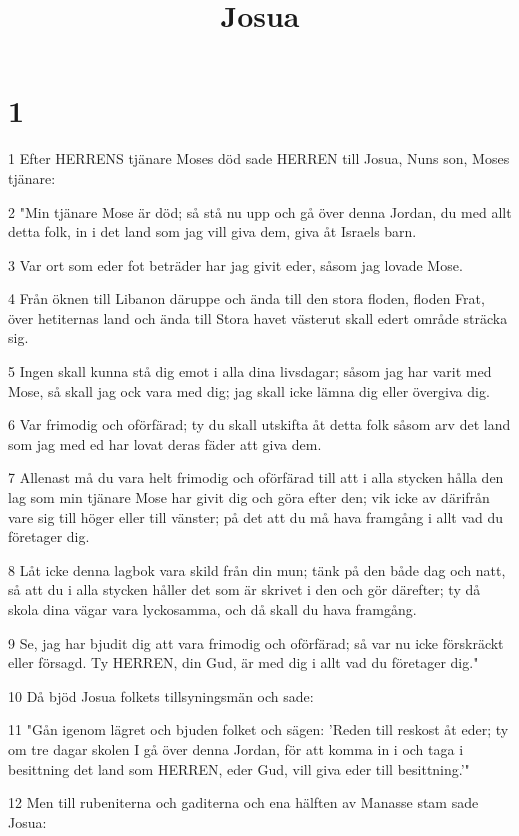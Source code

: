 

\title{Josua}


\chapter{1}

\par 1 Efter HERRENS tjänare Moses död sade HERREN till Josua, Nuns son, Moses tjänare:
\par 2 "Min tjänare Mose är död; så stå nu upp och gå över denna Jordan, du med allt detta folk, in i det land som jag vill giva dem, giva åt Israels barn.
\par 3 Var ort som eder fot beträder har jag givit eder, såsom jag lovade Mose.
\par 4 Från öknen till Libanon däruppe och ända till den stora floden, floden Frat, över hetiternas land och ända till Stora havet västerut skall edert område sträcka sig.
\par 5 Ingen skall kunna stå dig emot i alla dina livsdagar; såsom jag har varit med Mose, så skall jag ock vara med dig; jag skall icke lämna dig eller övergiva dig.
\par 6 Var frimodig och oförfärad; ty du skall utskifta åt detta folk såsom arv det land som jag med ed har lovat deras fäder att giva dem.
\par 7 Allenast må du vara helt frimodig och oförfärad till att i alla stycken hålla den lag som min tjänare Mose har givit dig och göra efter den; vik icke av därifrån vare sig till höger eller till vänster; på det att du må hava framgång i allt vad du företager dig.
\par 8 Låt icke denna lagbok vara skild från din mun; tänk på den både dag och natt, så att du i alla stycken håller det som är skrivet i den och gör därefter; ty då skola dina vägar vara lyckosamma, och då skall du hava framgång.
\par 9 Se, jag har bjudit dig att vara frimodig och oförfärad; så var nu icke förskräckt eller försagd. Ty HERREN, din Gud, är med dig i allt vad du företager dig."
\par 10 Då bjöd Josua folkets tillsyningsmän och sade:
\par 11 "Gån igenom lägret och bjuden folket och sägen: 'Reden till reskost åt eder; ty om tre dagar skolen I gå över denna Jordan, för att komma in i och taga i besittning det land som HERREN, eder Gud, vill giva eder till besittning.'"
\par 12 Men till rubeniterna och gaditerna och ena hälften av Manasse stam sade Josua:
